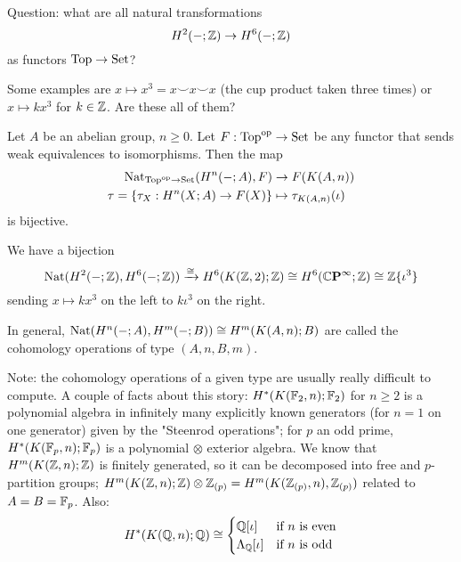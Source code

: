 Question: what are all natural transformations
\[H^2(-;{\mathbb Z})\to H^6(-;{\mathbb Z})\]
as functors ${\mathrm{Top}}\to{\mathrm{Set}}$?

Some examples are $x\mapsto x^3= x\smile x\smile x$ (the cup product taken three times) or $x\mapsto kx^3$ for $k\in{\mathbb Z}$. Are these all of them?

\begin{theorem}\label{theorem:cohomology-operations}
Let $A$ be an abelian group, $n\ge0$. Let $F:{\mathrm{Top}}^{\operatorname{op}}\to{\mathrm{Set}}$ be any functor that sends weak equivalences to isomorphisms. Then the map
\begin{align*}
    \operatorname{Nat}_{{\mathrm{Top}}^{\operatorname{op}}\to{\mathrm{Set}}}(H^n(-;A),F)&\to F(K(A,n))\\
    \tau=\{\tau_X:H^n(X;A)\to F(X)\}&\mapsto \tau_{K(A,n)}(\iota)
\end{align*}
is bijective.
\end{theorem}

\begin{example}
We have a bijection
\[\operatorname{Nat}(H^2(-;{\mathbb Z}),H^6(-;{\mathbb Z}))\xrightarrow{\cong}H^6(K({\mathbb Z},2);{\mathbb Z})\cong H^6({\mathbb{C}\mathbf{P}^{\infty}};{\mathbb Z})\cong{\mathbb Z}\{\iota^3\}\]
sending $x\mapsto kx^3$ on the left to $k\iota^3$ on the right.
\end{example}

In general, $\operatorname{Nat}(H^n(-;A),H^m(-;B))\cong H^m(K(A,n);B)$ are called the cohomology operations of type $(A,n,B,m)$.

Note: the cohomology operations of a given type are usually really difficult to compute. A couple of facts about this story: $H^*(K(\mathbb{F}_2,n);\mathbb{F}_2)$ for $n\ge2$ is a polynomial algebra in infinitely many explicitly known generators (for $n=1$ on one generator) given by the "Steenrod operations"; for $p$ an odd prime, $H^*(K(\mathbb{F}_p,n);\mathbb{F}_p)$ is a polynomial $\otimes$ exterior algebra. We know that $H^m(K({\mathbb Z},n);{\mathbb Z})$ is finitely generated, so it can be decomposed into free and $p$-partition groups; $H^m(K({\mathbb Z},n);{\mathbb Z})\otimes{\mathbb Z}_{(p)}=H^m(K({\mathbb Z}_{(p)},n),{\mathbb Z}_{(p)})$ related to $A=B=\mathbb{F}_p$. Also:
\[H^*(K({\mathbb Q},n);{\mathbb Q})\cong\begin{cases}
{\mathbb Q}[\iota] &\text{if } n\text{ is even}\\
\Lambda_{\mathbb Q}[\iota] &\text{if } n\text{ is odd}
\end{cases}
\]

